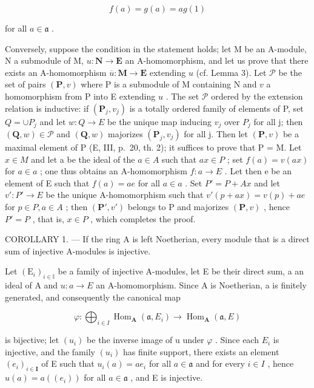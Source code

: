 \[
f (a) = g (a) = a g (1)
\]

for all \(a \in \mathfrak{a}\) .

Conversely, suppose the condition in the statement holds; let M be an A-module, N a submodule of M, \(u: \mathbf{N} \to \mathbf{E}\) an A-homomorphism, and let us prove that there exists an A-homomorphism \(\overline{u}: \mathbf{M} \to \mathbf{E}\) extending \(u\) (cf. Lemma 3). Let \(\mathcal{P}\) be the set of pairs \((\mathbf{P}, v)\) where P is a submodule of M containing N and \(v\) a homomorphism from P into E extending \(u\) . The set \(\mathcal{P}\) ordered by the extension relation is inductive: if \((\mathbf{P}_{j}, v_{j})\) is a totally ordered family of elements of P, set \(Q = \cup P_{j}\) and let \(w : Q \to E\) be the unique map inducing \(v_{j}\) over \(P_{j}\) for all j; then \((\mathbf{Q}, w) \in \mathcal{P}\) and \((\mathbf{Q}, w)\) majorizes \((\mathbf{P}_{j}, v_{j})\) for all j. Then let \((\mathbf{P}, v)\) be a maximal element of P (E, III, p.~20, th. 2); it suffices to prove that P = M. Let \(x \in M\) and let a be the ideal of the \(a \in A\) such that \(ax \in P\) ; set \(f(a) = v(ax)\) for \(a \in a\) ; one thus obtains an A-homomorphism \(f : a \to E\) . Let then e be an element of E such that \(f(a) = ae\) for all \(a \in a\) . Set \(P' = P + Ax\) and let \(v' : P' \to E\) be the unique A-homomorphism such that \(v'(p + ax) = v(p) + ae\) for \(p \in P, a \in A\) ; then \((\mathbf{P}', v')\) belongs to P and majorizes \((\mathbf{P}, v)\) , hence \(P' = P\) , that is, \(x \in P\) , which completes the proof.

COROLLARY 1. --- If the ring A is left Noetherian, every module that is a direct sum of injective A-modules is injective.

Let \((\mathrm{E}_{i})_{i\in\mathbb{I}}\) be a family of injective A-modules, let E be their direct sum, a an ideal of A and \(u:a\to E\) an A-homomorphism. Since A is Noetherian, a is finitely generated, and consequently the canonical map

\[
\varphi : \bigoplus_ {i \in I} \operatorname{Hom} _ {\mathbf {A}} (\mathfrak {a}, E _ {i}) \rightarrow \operatorname{Hom} _ {\mathbf {A}} (\mathfrak {a}, E)
\]

is bijective; let \((u_{i})\) be the inverse image of u under \(\varphi\) . Since each \(E_{i}\) is injective, and the family \((u_{i})\) has finite support, there exists an element \((e_{i})_{i\in\mathbf{I}}\) of E such that \(u_{i}(a)=ae_{i}\) for all \(a\in\mathfrak{a}\) and for every \(i\in I\) , hence \(u(a)=a((e_{i}))\) for all \(a\in\mathfrak{a}\) , and E is injective.

